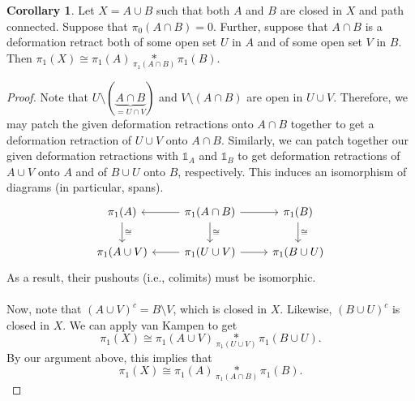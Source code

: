 \documentclass[10pt,letterpaper,cm]{nupset}
\theoremstyle{definition}
\theoremstyle{theorem}
\newtheorem{corollary}[definition]{Corollary}
\theoremstyle{remark}
\newcommand{\1}{\mathbb{1}}
\newcommand{\0}{\vec 0}
\begin{document}
\begin{corollary}
Let $X = A\cup B$ such that both $A$ and $B$ are closed in $X$ and path connected. Suppose that $\pi_0(A\cap B) =0$. Further, suppose that $A \cap B$ is a deformation retract both of some open set $U$ in $A$ and of some open set $V$ in $B$. Then $\pi_1(X) \cong \pi_1(A) \underset{\pi_1(A\cap B)}{\ast} \pi_1(B)$.  
\end{corollary}
\begin{proof}
Note that $U \setminus (\underbrace{A \cap B}_{=U \cap V})$ and $V \setminus (A \cap B)$ are open in $U \cup V$. Therefore, we may patch the given deformation retractions onto $A \cap B$ together to get a deformation retraction of $U \cup V$ onto $A \cap B$. Similarly, we can patch together our given deformation retractions with $\1_A$ and $\1_B$ to get deformation retractions of $A\cup V$ onto $A$ and of $B\cup U$ onto $B$, respectively. 
This induces an isomorphism of diagrams (in particular, spans).
\[
\begin{tikzcd}
\pi_1(A) \arrow[d, "\cong"] & \pi_1(A \cap B) \arrow[d, "\cong"]  \arrow[r] \arrow[l] & \pi_1(B) \arrow[d, "\cong"] \\
\pi_1(A \cup V) & \pi_1(U \cup V) \arrow[l] \arrow[r] & \pi_1(B \cup U) 
\end{tikzcd}
\] As a result, their pushouts (i.e., colimits) must be isomorphic. 
\\ \\ Now, note that $(A \cup V)^c = B \setminus V$, which  is closed in $X$. Likewise, $(B \cup U)^c$ is closed in $X$. We can apply van Kampen to get
$$  \pi_1(X) \cong \pi_1(A\cup V) \underset{\pi_1(U \cup V)}{\ast} \pi_1(B \cup U) .$$ By our argument above, this implies that $$  \pi_1(X)  \cong \pi_1(A) \underset{\pi_1(A \cap B)}{\ast} \pi_1(B) .$$
\end{proof}
\end{document}
